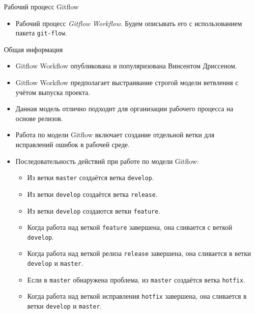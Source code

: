 \documentclass[
  ignorenonframetext,
  aspectratio=169,
  russian,
]{beamer}
\providecommand{\tightlist}{%
  \setlength{\itemsep}{0pt}\setlength{\parskip}{0pt}}
\begin{document}
\begin{frame}[fragile]{Рабочий процесс Gitflow}
\protect{}\label{ux440ux430ux431ux43eux447ux438ux439-ux43fux440ux43eux446ux435ux441ux441-gitflow}
\begin{itemize}[<+->]
\tightlist
\item
  Рабочий процесс \emph{Gitflow Workflow}. Будем описывать его с
  использованием пакета \texttt{git-flow}.
\end{itemize}

\begin{block}{Общая информация}
\protect{}\label{ux43eux431ux449ux430ux44f-ux438ux43dux444ux43eux440ux43cux430ux446ux438ux44f}
\begin{itemize}[<+->]
\tightlist
\item
  Gitflow Workflow опубликована и популяризована Винсентом Дриссеном.
\item
  Gitflow Workflow предполагает выстраивание строгой модели ветвления с
  учётом выпуска проекта.
\item
  Данная модель отлично подходит для организации рабочего процесса на
  основе релизов.
\item
  Работа по модели Gitflow включает создание отдельной ветки для
  исправлений ошибок в рабочей среде.
\item
  Последовательность действий при работе по модели Gitflow:

  \begin{itemize}[<+->]
  \tightlist
  \item
    Из ветки \texttt{master} создаётся ветка \texttt{develop}.
  \item
    Из ветки \texttt{develop} создаётся ветка \texttt{release}.
  \item
    Из ветки \texttt{develop} создаются ветки \texttt{feature}.
  \item
    Когда работа над веткой \texttt{feature} завершена, она сливается с
    веткой \texttt{develop}.
  \item
    Когда работа над веткой релиза \texttt{release} завершена, она
    сливается в ветки \texttt{develop} и \texttt{master}.
  \item
    Если в \texttt{master} обнаружена проблема, из \texttt{master}
    создаётся ветка \texttt{hotfix}.
  \item
    Когда работа над веткой исправления \texttt{hotfix} завершена, она
    сливается в ветки \texttt{develop} и \texttt{master}.
  \end{itemize}
\end{itemize}
\end{block}


\end{frame}
\end{document}
